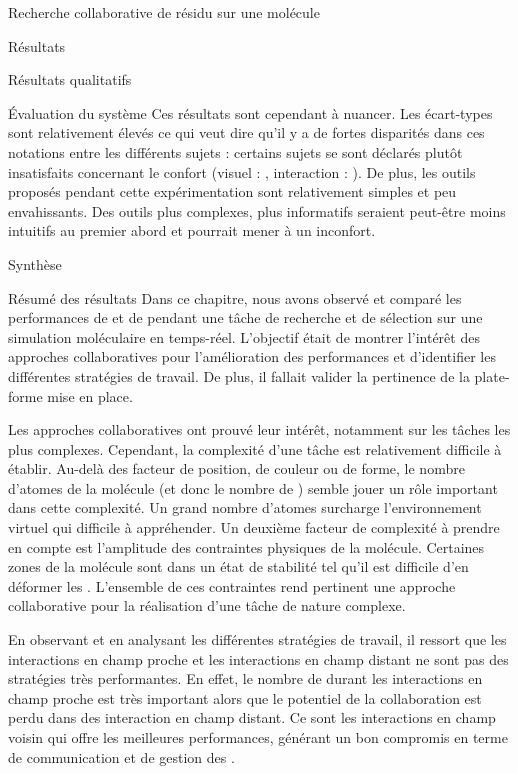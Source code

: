 \documentclass[myfrancais,ngerman,english,frenchb]{mythesis}
\begin{document}
\begin{mychapter}{Recherche collaborative de résidu sur une molécule}
\begin{mysection}{Résultats}
\begin{mysubsection}{Résultats qualitatifs}
\begin{mysubsubsection}{Évaluation du système}
					Ces résultats sont cependant à nuancer.
					Les écart-types sont relativement élevés ce qui veut dire qu'il y a de fortes disparités dans ces notations entre les différents sujets : certains sujets se sont déclarés plutôt insatisfaits concernant le confort (visuel : \mynum{2}, interaction : ).
					De plus, les outils proposés pendant cette expérimentation sont relativement simples et peu envahissants.
					Des outils plus complexes, plus informatifs seraient peut-être moins intuitifs au premier abord et pourrait mener à un inconfort.
				\end{mysubsubsection}
			\end{mysubsection}
		\end{mysection}
		\begin{mysection}{Synthèse}
			\begin{mysubsection}{Résumé des résultats}
				Dans ce chapitre, nous avons observé et comparé les performances de  et de  pendant une tâche de recherche et de sélection sur une simulation moléculaire en temps-réel.
				L'objectif était de montrer l'intérêt des approches collaboratives pour l'amélioration des performances et d'identifier les différentes stratégies de travail.
				De plus, il fallait valider la pertinence de la plate-forme mise en place.

				Les approches collaboratives ont prouvé leur intérêt, notamment sur les tâches les plus complexes.
				Cependant, la complexité d'une tâche est relativement difficile à établir.
				Au-delà des facteur de position, de couleur ou de forme, le nombre d'atomes de la molécule (et donc le nombre de ) semble jouer un rôle important dans cette complexité.
				Un grand nombre d'atomes surcharge l'environnement virtuel qui difficile à appréhender.
				Un deuxième facteur de complexité à prendre en compte est l'amplitude des contraintes physiques de la molécule.
				Certaines zones de la molécule sont dans un état de stabilité tel qu'il est difficile d'en déformer les .
				L'ensemble de ces contraintes rend pertinent une approche collaborative pour la réalisation d'une tâche de nature complexe.

				En observant et en analysant les différentes stratégies de travail, il ressort que les interactions en champ proche et les interactions en champ distant ne sont pas des stratégies très performantes.
				En effet, le nombre de  durant les interactions en champ proche est très important alors que le potentiel de la collaboration est perdu dans des interaction en champ distant.
				Ce sont les interactions en champ voisin qui offre les meilleures performances, générant un bon compromis en terme de communication et de gestion des .


\end{mysubsection}
\end{mysection}
\end{mychapter}
\end{document}

